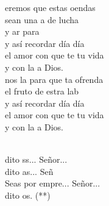 \documentclass[12pt]{article}
\begin{document}
\begin{multicols*}{2}
\begin{cancion}%
	eremos que estas oendas \\
	sean una a de lucha \\
	y ar para \\
	y así recordar día día \\
	el amor con que te tu vida \\
	y con la a Dios.\\
	nos la  para que ta ofrenda \\
	 el fruto de estra lab\\
	y así recordar día día \\
	el amor con que te tu vida\\
	y con la a Dios.\\\jump\\
	\begin{chorus}%
	dito ss... Señor...\\
	dito as... Señ\\
	Seas por empre... Señor...\\
	dito os. (**)\\
	\end{chorus}%
	\jump\\
\end{cancion}%


\end{multicols*}
\end{document}
